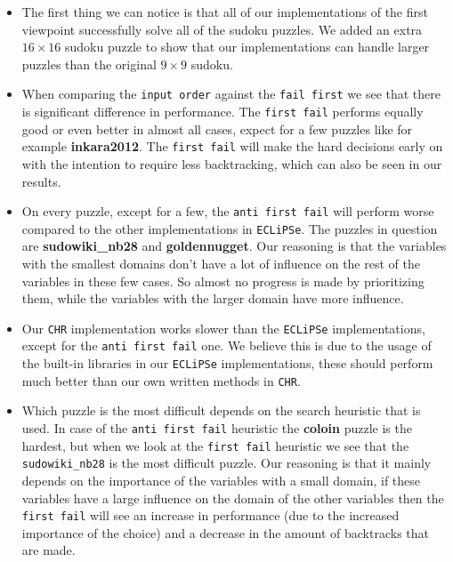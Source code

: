 \begin{itemize}
\item The first thing we can notice is that all of our implementations of the first viewpoint successfully solve all of the sudoku puzzles. We added an extra $16 \times 16$ sudoku puzzle to show that our implementations can handle larger puzzles than the original $9 \times 9$ sudoku.
\item When comparing the \texttt{input order} against the \texttt{fail first} we see that there is significant difference in performance. The \texttt{first fail} performs equally good or even better in almost all cases, expect for a few puzzles like for example \textbf{inkara2012}. The \texttt{first fail} will make the hard decisions early on with the intention to require less backtracking, which can also be seen in our results.
\item On every puzzle, except for a few, the \texttt{anti first fail} will perform worse compared to the other implementations in \texttt{ECLiPSe}. The puzzles in question are \textbf{sudowiki\_nb28} and \textbf{goldennugget}. Our reasoning is that the variables with the smallest domains don't have a lot of influence on the rest of the variables in these few cases. So almost no progress is made by prioritizing them, while the variables with the larger domain have more influence.
\item Our \texttt{CHR} implementation works slower than the \texttt{ECLiPSe} implementations, except for the \texttt{anti first fail} one. We believe this is due to the usage of the built-in libraries in our \texttt{ECLiPSe} implementations, these should perform much better than our own written methods in \texttt{CHR}.
\item Which puzzle is the most difficult depends on the search heuristic that is used. In case of the \texttt{anti first fail} heuristic the \textbf{coloin} puzzle is the hardest, but when we look at the \texttt{first fail} heuristic we see that the \texttt{sudowiki\_nb28} is the most difficult puzzle. Our reasoning is that it mainly depends on the importance of the variables with a small domain, if these variables have a large influence on the domain of the other variables then the \texttt{first fail} will see an increase in performance (due to the increased importance of the choice) and a decrease in the amount of backtracks that are made. 
\end{itemize}

